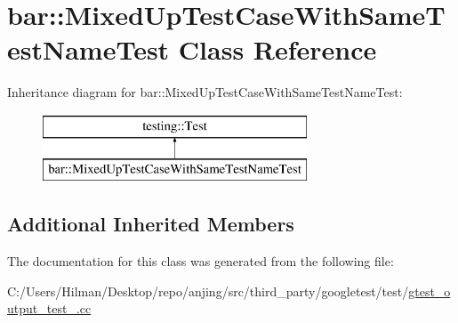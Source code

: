 \hypertarget{classbar_1_1_mixed_up_test_case_with_same_test_name_test}{}\section{bar\+:\+:Mixed\+Up\+Test\+Case\+With\+Same\+Test\+Name\+Test Class Reference}
\label{classbar_1_1_mixed_up_test_case_with_same_test_name_test}
Inheritance diagram for bar\+:\+:Mixed\+Up\+Test\+Case\+With\+Same\+Test\+Name\+Test\+:\begin{figure}[H]
\begin{center}
\leavevmode
\includegraphics[height=2.000000cm]{classbar_1_1_mixed_up_test_case_with_same_test_name_test}
\end{center}
\end{figure}
\subsection*{Additional Inherited Members}


The documentation for this class was generated from the following file\+:\begin{DoxyCompactItemize}
\item 
C\+:/\+Users/\+Hilman/\+Desktop/repo/anjing/src/third\+\_\+party/googletest/test/\hyperlink{gtest__output__test___8cc}{gtest\+\_\+output\+\_\+test\+\_\+.\+cc}\end{DoxyCompactItemize}
